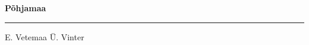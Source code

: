 \documentclass[10pt]{book}
\begin{document}
{
  \samepage
  \raggedbottom
  \raggedright
  \sloppy


  \vspace{0.2in}

  \noindent\begin{minipage}{.1\textwidth}
    \hfill\vspace{0.1in}
  \end{minipage}%
  \noindent\begin{minipage}{.8\textwidth}
    \centering
    \bfseries
    \large P\~ohjamaa
  \end{minipage}%
  \noindent\begin{minipage}{.1\textwidth}
      \hfill\vspace{0.1in}
  \end{minipage}

  \nopagebreak[4]
  \vspace{0.1in}
  \nopagebreak[4]
  \hrule height 0.05ex
  \nopagebreak[4]
  \vspace{-0.05in}

  {\footnotesize E. Vetemaa \hfill \"U. Vinter }\\
  \vspace{0.01in}



}
\end{document}
